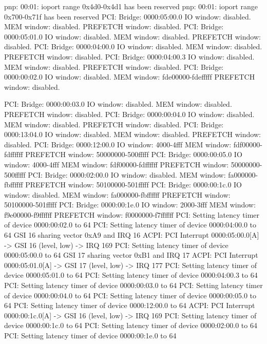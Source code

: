 \documentclass[mingoth,a4paper]{jsarticle}
\begin{document}
{{{{{\begin{commandline}
pnp: 00:01: ioport range 0x4d0-0x4d1 has been reserved
pnp: 00:01: ioport range 0x700-0x71f has been reserved
PCI: Bridge: 0000:05:00.0
  IO window: disabled.
  MEM window: disabled.
  PREFETCH window: disabled.
PCI: Bridge: 0000:05:01.0
  IO window: disabled.
  MEM window: disabled.
  PREFETCH window: disabled.
PCI: Bridge: 0000:04:00.0
  IO window: disabled.
  MEM window: disabled.
  PREFETCH window: disabled.
PCI: Bridge: 0000:04:00.3
  IO window: disabled.
  MEM window: disabled.
  PREFETCH window: disabled.
PCI: Bridge: 0000:00:02.0
  IO window: disabled.
  MEM window: fde00000-fdefffff
  PREFETCH window: disabled.
\end{commandline}
\begin{commandline}
PCI: Bridge: 0000:00:03.0
  IO window: disabled.
  MEM window: disabled.
  PREFETCH window: disabled.
PCI: Bridge: 0000:00:04.0
  IO window: disabled.
  MEM window: disabled.
  PREFETCH window: disabled.
PCI: Bridge: 0000:13:04.0
  IO window: disabled.
  MEM window: disabled.
  PREFETCH window: disabled.
PCI: Bridge: 0000:12:00.0
  IO window: 4000-4fff
  MEM window: fdf00000-fdffffff
  PREFETCH window: 50000000-500fffff
PCI: Bridge: 0000:00:05.0
  IO window: 4000-4fff
  MEM window: fdf00000-fdffffff
  PREFETCH window: 50000000-500fffff
PCI: Bridge: 0000:02:00.0
  IO window: disabled.
  MEM window: fa000000-fbffffff
  PREFETCH window: 50100000-501fffff
PCI: Bridge: 0000:00:1c.0
  IO window: disabled.
  MEM window: fa000000-fbffffff
  PREFETCH window: 50100000-501fffff
PCI: Bridge: 0000:00:1e.0
  IO window: 2000-3fff
  MEM window: f9e00000-f9ffffff
  PREFETCH window: f0000000-f7ffffff
PCI: Setting latency timer of device 0000:00:02.0 to 64
PCI: Setting latency timer of device 0000:04:00.0 to 64
GSI 16 sharing vector 0xA9 and IRQ 16
ACPI: PCI Interrupt 0000:05:00.0[A] -> GSI 16 (level, low) -> IRQ 169
PCI: Setting latency timer of device 0000:05:00.0 to 64
GSI 17 sharing vector 0xB1 and IRQ 17
ACPI: PCI Interrupt 0000:05:01.0[A] -> GSI 17 (level, low) -> IRQ 177
PCI: Setting latency timer of device 0000:05:01.0 to 64
PCI: Setting latency timer of device 0000:04:00.3 to 64
PCI: Setting latency timer of device 0000:00:03.0 to 64
PCI: Setting latency timer of device 0000:00:04.0 to 64
PCI: Setting latency timer of device 0000:00:05.0 to 64
PCI: Setting latency timer of device 0000:12:00.0 to 64
ACPI: PCI Interrupt 0000:00:1c.0[A] -> GSI 16 (level, low) -> IRQ 169
PCI: Setting latency timer of device 0000:00:1c.0 to 64
PCI: Setting latency timer of device 0000:02:00.0 to 64
PCI: Setting latency timer of device 0000:00:1e.0 to 64

\end{commandline}}}}}}
\end{document}
